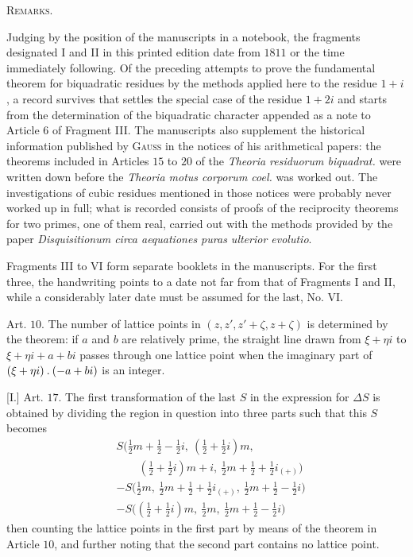 
\par\bigskip{}
\begin{center}\large\scshape Remarks.\end{center}
Judging by the position of the manuscripts in a notebook, the fragments designated I and II in this printed edition date from $1811$ or the time immediately following. Of the preceding attempts to prove the fundamental theorem for biquadratic residues by the methods applied here to the residue $1+i$, a record survives that settles the special case of the residue $1+2i$ and starts from the determination of the biquadratic character appended as a note to Article $6$ of Fragment III. The manuscripts also supplement the historical information published by \textsc{Gauss} in the notices of his arithmetical papers: the theorems included in Articles $15$ to $20$ of the \emph{Theoria residuorum biquadrat.} were written down before the \emph{Theoria motus corporum coel.} was worked out. The investigations of cubic residues mentioned in those notices were probably never worked up in full; what is recorded consists of proofs of the reciprocity theorems for two primes, one of them real, carried out with the methods provided by the paper \emph{Disquisitionum circa aequationes puras ulterior evolutio}.

Fragments III to VI form separate booklets in the manuscripts. For the first three, the handwriting points to a date not far from that of Fragments I and II, while a considerably later date must be assumed for the last, No. VI.

\par\medskip
[I.] Art. $10$. The number of lattice points in $(z,z',z'+\zeta,z+\zeta)$ is determined by the theorem: if $a$ and $b$ are relatively prime, the straight line drawn from $\xi+\eta i$ to $\xi+\eta i+a+bi$ passes through one lattice point when the imaginary part of $(\xi+\eta i)\mathbin{.}(-a+bi)$ is an integer.


[I.] Art. $17$. The first transformation of the last $S$ in the expression for $\Delta S$ is obtained by dividing the region in question into three parts such that this $S$ becomes
\[
\begin{aligned}
&S\bigl(\tfrac12m+\tfrac12-\tfrac12i,\ (\tfrac12+\tfrac12i)m,\\
&\qquad(\tfrac12+\tfrac12i)m+i,\ \tfrac12m+\tfrac12+\tfrac12i_{(+)}\bigr)\\
&-S\bigl(\tfrac12m,\ \tfrac12m+\tfrac12+\tfrac12i_{(+)},\ \tfrac12m+\tfrac12-\tfrac12i\bigr)\\
&-S\bigl((\tfrac12+\tfrac12i)m,\ \tfrac12m,\ \tfrac12m+\tfrac12-\tfrac12i\bigr)
\end{aligned}
\]
then counting the lattice points in the first part by means of the theorem in Article $10$, and further noting that the second part contains no lattice point.

